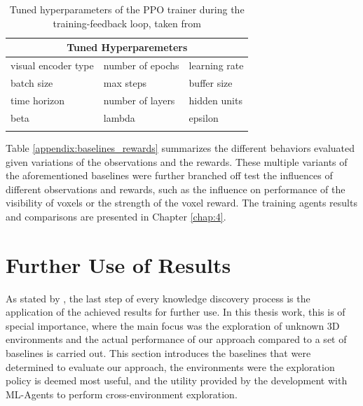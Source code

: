 \begin{longtable}{@{} p{3.5cm} p{3.5cm} p{3.5cm} @{}} \toprule
\multicolumn{3}{c}{Tuned Hyperparemeters}\\ \midrule
visual encoder type         & 
number of epochs                   & 
learning rate               \\ 

batch size                  &  
max steps                   &
buffer size                 \\

time horizon                &
number of layers            &
hidden units                \\

beta                        &
lambda                      &
epsilon                     \\\bottomrule
\caption{Tuned hyperparameters of the PPO trainer during the training-feedback loop, taken from \cite{github-unity-mlagents-toolkit}} \label{tab:trainer-hyperparameters}
\end{longtable} 

Table \ref{appendix:baselines_rewards} summarizes the different behaviors evaluated given variations of the observations and the rewards. These multiple variants of the aforementioned baselines were further branched off test the influences of different observations and rewards, such as the influence on performance of the visibility of voxels or the strength of the voxel reward. The training agents 
results and comparisons are presented in Chapter \ref{chap:4}. 


\section{Further Use of Results}\label{chap:3:further-use}
As stated by \textcite{luckert2016using}, the last step of every knowledge discovery process is the application of the achieved results for further use. In this thesis work, this is of special importance, where the main focus was the exploration of unknown 3D environments and the actual performance of our approach compared to a set of baselines is carried out. This section introduces the baselines that were determined to evaluate our approach, the environments were the exploration policy is deemed most useful, and the utility provided by the development with ML-Agents to perform cross-environment exploration.

